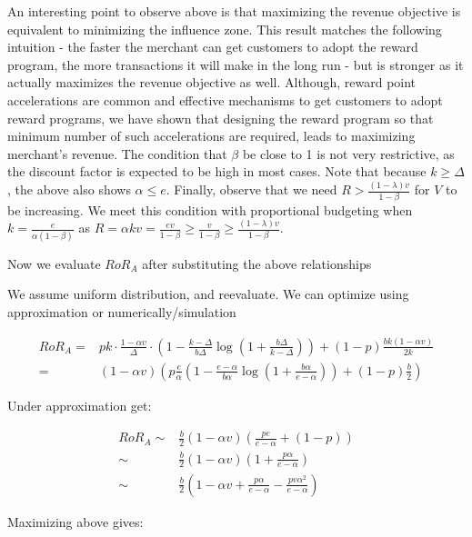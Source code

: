 An interesting point to observe above is that maximizing the revenue objective is equivalent to minimizing the influence zone.
This result matches the following intuition - the faster the merchant can get customers to adopt the reward program, the more transactions it will make in the long run - but is stronger as it actually maximizes the revenue objective as well. 
Although, reward point accelerations are common and effective mechanisms to get customers to adopt reward programs, we have shown that designing the reward program so that minimum number of such accelerations are required, leads to maximizing merchant's revenue. 
The condition that $\beta$ be close to 1 is not very restrictive, as the discount factor is expected to be high in most cases. 
Note that because $k \geq \Delta$, the above also shows $\alpha \leq e$. 
Finally, observe that we need $R > \frac{(1-\lambda)v}{1-\beta}$ for $V$ to be increasing. 
We meet this condition with proportional budgeting when $k = \frac{e}{\alpha(1-\beta)}$ as $R = \alpha k v = \frac{e v}{1-\beta} \geq \frac{v}{1-\beta} \geq \frac{(1-\lambda)v}{1-\beta}$. 


{\arpit Now we evaluate $RoR_A$ after substituting the above relationships}

{\arpit We assume uniform distribution, and reevaluate. We can optimize using approximation or numerically/simulation}

\begin{align*}
RoR_A =& pk\cdot\frac{1-\alpha v}{\Delta}\cdot\left(1 - \frac{k-\Delta}{b\Delta}\log\left(1+\frac{b\Delta}{k-\Delta}\right)\right) + (1-p)\frac{bk(1-\alpha v)}{2k}\\
      =& (1-\alpha v) \left(p\frac{e}{\alpha}\left(1-\frac{e-\alpha}{b\alpha}\log\left(1+\frac{b\alpha}{e-\alpha}\right)\right) + (1-p)\frac{b}{2}\right)
\end{align*}

Under approximation get:

\begin{align*}
RoR_A \sim & \frac{b}{2}(1-\alpha v)\left(\frac{pe}{e-\alpha} + (1-p)\right)\\
      \sim & \frac{b}{2}(1-\alpha v) \left(1 + \frac{p\alpha}{e-\alpha}\right)\\
       \sim & \frac{b}{2}\left(1-\alpha v + \frac{p\alpha}{e-\alpha} - \frac{pv\alpha^2}{e-\alpha}\right)
\end{align*}

Maximizing above gives:

